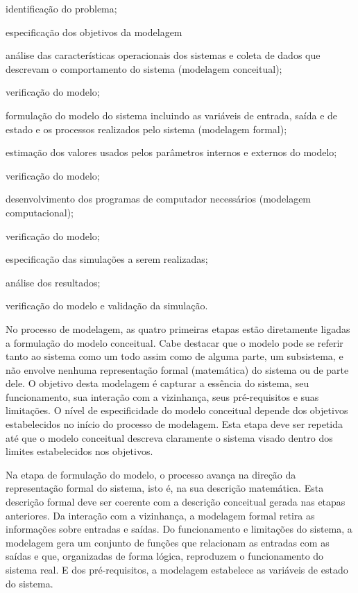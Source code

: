 \documentclass[a4paper,12pt,oneside,onecolumn]{uerj}
\begin{document}
\begin{lcircp}
    \item identificação do problema;
    \item especificação dos objetivos da modelagem
    \item análise das características operacionais dos sistemas e coleta de dados que descrevam o comportamento do sistema (modelagem conceitual);
    \item verificação do modelo;
    \item formulação do modelo do sistema incluindo as variáveis de entrada, saída e de estado e os processos realizados pelo sistema (modelagem formal);
    \item estimação dos valores usados pelos parâmetros internos e externos do modelo;
    \item verificação do modelo;
    \item desenvolvimento dos programas de computador necessários (modelagem computacional);
    \item verificação do modelo;
    \item especificação das simulações a serem realizadas;
    \item análise dos resultados;
    \item verificação do modelo e validação da simulação.\\
\end{lcircp}

No processo de modelagem, as quatro primeiras etapas estão diretamente ligadas a formulação do modelo conceitual. Cabe destacar que o modelo pode se referir tanto ao sistema como um todo assim como de alguma parte, um subsistema, e não envolve nenhuma representação formal (matemática) do sistema ou de parte dele. O objetivo desta modelagem é capturar a essência do sistema, seu funcionamento, sua interação com a vizinhança, seus pré-requisitos e suas limitações. O nível de especificidade do modelo conceitual depende dos objetivos estabelecidos no início do processo de modelagem. Esta etapa deve ser repetida até que o modelo conceitual descreva claramente o sistema visado dentro dos limites estabelecidos nos objetivos.

Na etapa de formulação do modelo, o processo avança na direção da representação formal do sistema, isto é, na sua descrição matemática. Esta descrição formal deve ser coerente com a descrição conceitual gerada nas etapas anteriores. Da interação com a vizinhança, a modelagem formal retira as informações sobre entradas e saídas. Do funcionamento e limitações do sistema, a modelagem gera um conjunto de funções que relacionam as entradas com as saídas e que, organizadas de forma lógica, reproduzem o funcionamento do sistema real. E dos pré-requisitos, a modelagem estabelece as variáveis de estado do sistema.
\end{document}
